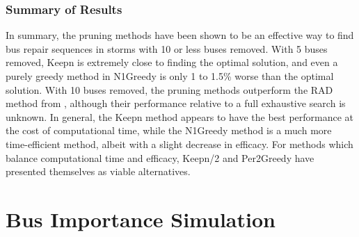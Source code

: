 \documentclass[12pt]{article}
\begin{document}
\subsubsection{Summary of Results}
In summary, the pruning methods have been shown to be an effective way to find bus repair sequences in storms with 10 or less buses removed. With 5 buses removed, Keepn is extremely close to finding the optimal solution, and even a purely greedy method in N1Greedy is only 1 to 1.5\% worse than the optimal solution. With 10 buses removed, the pruning methods outperform the RAD method from \cite{coffrin2012}, although their performance relative to a full exhaustive search is unknown. In general, the Keepn method appears to have the best performance at the cost of computational time, while the N1Greedy method is a much more time-efficient method, albeit with a slight decrease in efficacy. For methods which balance computational time and efficacy, Keepn/2 and Per2Greedy have presented themselves as viable alternatives.
\newpage

\section{Bus Importance Simulation}
\end{document}
